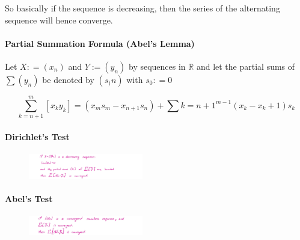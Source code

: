 \documentclass[class=article, crop=false]{standalone}
\begin{document}
So basically if the sequence is decreasing, then the series of the
alternating sequence will hence converge.

\hypertarget{header-n3307}{%
	\newpage
\paragraph{Partial Summation Formula (Abel's
Lemma)}\label{header-n3307}}

Let \(X: = \left( x_n \right)\) and \(Y:= \left( y_n \right)\) by
sequences in \(\mathbb{R}\) and let the partial sums of
\(\sum\left( y_n \right)\) be denoted by \(\left( s_)n \right)\) with
\(s_0 : = 0\)

\[\sum_{k=n+1}^{m}\left[ x_ky_k \right]=\left( x_ms_m - x_{n+1}s_n \right) + \sum{k=n+1}^{m-1}\left( x_k-x_k+1 \right)s_k
  \label{partsum}\]



\hypertarget{header-n3311}{%
\paragraph{Dirichlet's Test}\label{header-n3311}}

\begin{figure}
\centering
\includegraphics[width=5cm]{media/InfSeries/BE23258A-CC18-49A6-AABB-E71063CAF34C.jpeg}
\caption{}
\end{figure}

\hypertarget{header-n3314}{%
\paragraph{Abel's Test}\label{header-n3314}}

\begin{figure}
\centering
\includegraphics[width=5cm]{media/InfSeries/6360D524-9307-4308-94C1-BCA6D2E0ECE7.jpeg}
\caption{}
\end{figure}
\end{document}
